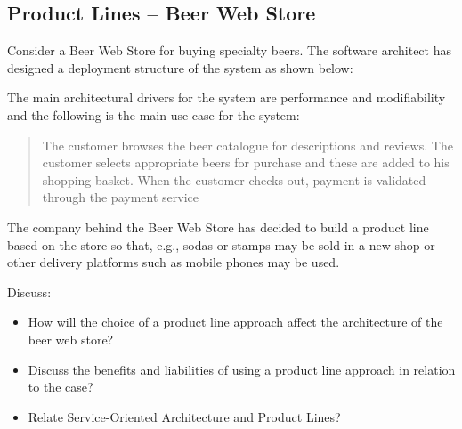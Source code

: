 \newpage
\subsection{Product Lines -- Beer Web Store}
Consider a Beer Web Store for buying specialty beers. The software
architect has designed a deployment structure of the system as shown
below:
\begin{figure}[h!]
  \centerline{}
  \label{fig:observation}
\end{figure}
The main architectural drivers for the system are performance and
modifiability and the following is the main use case for the system:
\begin{quote}
  The customer browses the beer catalogue for descriptions and
  reviews. The customer selects appropriate beers for purchase and
  these are added to his shopping basket. When the customer checks
  out, payment is validated through the payment service
\end{quote}

The company behind the Beer Web Store has decided to build a product
line based on the store so that, e.g., sodas or stamps may be sold in
a new shop or other delivery platforms such as mobile phones may be
used.

Discuss:
\begin{itemize}
\item How will the choice of a product line approach affect the
  architecture of the beer web store?
  \item Discuss the benefits and liabilities of using a product line
    approach in relation to the case?
  \item Relate Service-Oriented Architecture and Product Lines?
\end{itemize}

